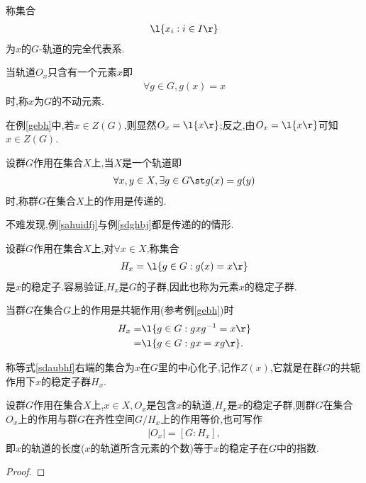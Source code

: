 \begin{definition}[完全代表系]
    称集合\begin{align*}
        \l\{x_i:i\in I\r\}
    \end{align*}为$x$的$G$-轨道的完全代表系.
\end{definition}
\begin{definition}[不动元素]
    当轨道$O_x$只含有一个元素$x$即\begin{align*}
        \forall g\in G,g(x)=x
    \end{align*}时,称$x$为$G$的不动元素.
\end{definition}
在例\ref{gebh}中,若$x\in Z(G)$,则显然$O_x=\l\{x\r\}$;反之,由$O_x=\l\{x\r\}$可知$x\in Z(G)$.
\begin{definition}[传递的]
    设群$G$作用在集合$X$上,当$X$是一个轨道即\begin{align*}
        \forall x,y\in X,\exists g\in G\st g(x)=g(y)
    \end{align*}时,称群$G$在集合$X$上的作用是传递的.
\end{definition}
不难发现,例\ref{sahuidfj}与例\ref{sdghbj}都是传递的的情形.
\begin{definition}[稳定子与稳定子群]
    设群$G$作用在集合$X$上,对$\forall x\in X$,称集合\begin{align*}
        H_x=\l\{g\in G:g(x)=x\r\}
    \end{align*}是$x$的稳定子.容易验证,$H_x$是$G$的子群,因此也称为元素$x$的稳定子群.
\end{definition}
当群$G$在集合$G$上的作用是共轭作用(参考例\ref{gebh})时\begin{align}
    H_x=&\l\{g\in G:gxg^{-1}=x\r\}\nonumber\\
    =&\l\{g\in G:gx=xg\r\}.\label{sdaubhf}
\end{align}
\begin{definition}[中心化子]\label{vxhz}
    称等式\eqref{sdaubhf}右端的集合为$x$在$G$里的中心化子,记作$Z(x)$,它就是在群$G$的共轭作用下$x$的稳定子群$H_x$.
\end{definition}
\begin{theorem}[轨道-稳定子定理]\label{gdwdzdl}
    设群$G$作用在集合$X$上,$x\in X,O_x$是包含$x$的轨道,$H_x$是$x$的稳定子群,则群$G$在集合$O_x$上的作用与群$G$在齐性空间$G/H_x$上的作用等价,也可写作\begin{align*}
        |O_x|=[G:H_x],
    \end{align*}即$x$的轨道的长度($x$的轨道所含元素的个数)等于$x$的稳定子在$G$中的指数.
\end{theorem}
\begin{proof}
    \stars
\end{proof}
